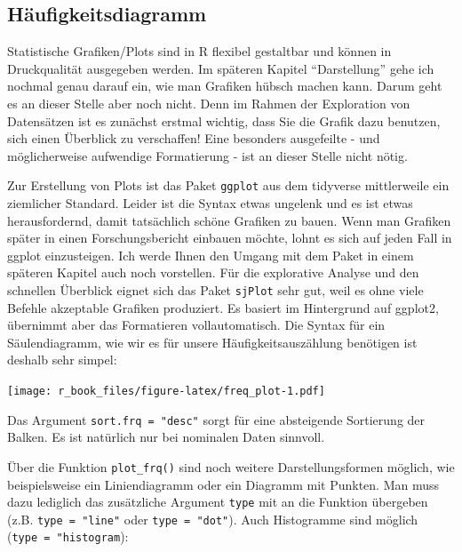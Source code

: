 \documentclass[
]{book}
\newenvironment{Shaded}{\begin{snugshade}}{\end{snugshade}}
\newcommand{\AttributeTok}[1]{\textcolor[rgb]{0.77,0.63,0.00}{#1}}
\newcommand{\FunctionTok}[1]{\textcolor[rgb]{0.00,0.00,0.00}{#1}}
\newcommand{\NormalTok}[1]{#1}
\newcommand{\SpecialCharTok}[1]{\textcolor[rgb]{0.00,0.00,0.00}{#1}}
\newcommand{\StringTok}[1]{\textcolor[rgb]{0.31,0.60,0.02}{#1}}
\begin{document}
\hypertarget{huxe4ufigkeitsdiagramm}{%
\subsection{Häufigkeitsdiagramm}\label{huxe4ufigkeitsdiagramm}}

Statistische Grafiken/Plots sind in R flexibel gestaltbar und können in Druckqualität ausgegeben werden. Im späteren Kapitel ``Darstellung'' gehe ich nochmal genau darauf ein, wie man Grafiken hübsch machen kann. Darum geht es an dieser Stelle aber noch nicht. Denn im Rahmen der Exploration von Datensätzen ist es zunächst erstmal wichtig, dass Sie die Grafik dazu benutzen, sich einen Überblick zu verschaffen! Eine besonders ausgefeilte - und möglicherweise aufwendige Formatierung - ist an dieser Stelle nicht nötig.

Zur Erstellung von Plots ist das Paket \texttt{ggplot} aus dem tidyverse mittlerweile ein ziemlicher Standard. Leider ist die Syntax etwas ungelenk und es ist etwas herausfordernd, damit tatsächlich schöne Grafiken zu bauen. Wenn man Grafiken später in einen Forschungsbericht einbauen möchte, lohnt es sich auf jeden Fall in ggplot einzusteigen. Ich werde Ihnen den Umgang mit dem Paket in einem späteren Kapitel auch noch vorstellen. Für die explorative Analyse und den schnellen Überblick eignet sich das Paket \texttt{sjPlot} sehr gut, weil es ohne viele Befehle akzeptable Grafiken produziert. Es basiert im Hintergrund auf ggplot2, übernimmt aber das Formatieren vollautomatisch. Die Syntax für ein Säulendiagramm, wie wir es für unsere Häufigkeitsauszählung benötigen ist deshalb sehr simpel:

\begin{Shaded}
\end{Shaded}

\texttt{[image: r\_book\_files/figure-latex/freq\_plot-1.pdf]}

Das Argument \texttt{sort.frq\ =\ "desc"} sorgt für eine absteigende Sortierung der Balken. Es ist natürlich nur bei nominalen Daten sinnvoll.

Über die Funktion \texttt{plot\_frq()} sind noch weitere Darstellungsformen möglich, wie beispielsweise ein Liniendiagramm oder ein Diagramm mit Punkten. Man muss dazu lediglich das zusätzliche Argument \texttt{type} mit an die Funktion übergeben (z.B. \texttt{type\ =\ "line"} oder \texttt{type\ =\ "dot"}). Auch Histogramme sind möglich (\texttt{type\ =\ "histogram}):
\end{document}
